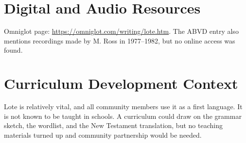 \documentclass[12pt]{article}
\begin{document}
\section{Digital and Audio Resources}
Omniglot page: \url{https://omniglot.com/writing/lote.htm}. The ABVD entry also mentions recordings made by M. Ross in 1977--1982, but no online access was found.

\section{Curriculum Development Context}
Lote is relatively vital, and all community members use it as a first language. It is not known to be taught in schools. A curriculum could draw on the grammar sketch, the wordlist, and the New Testament translation, but no teaching materials turned up and community partnership would be needed.
\end{document}
